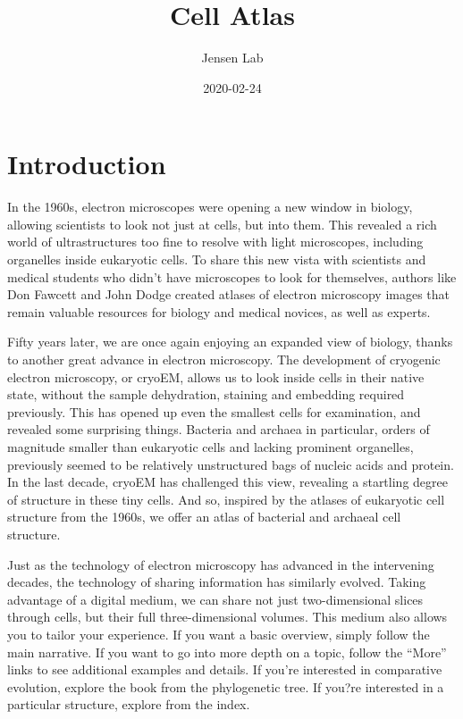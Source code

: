 \documentclass[]{tufte-book}
\title{Cell Atlas}
\author{Jensen Lab}
\date{2020-02-24}
\begin{document}
\maketitle



{
\setcounter{tocdepth}{1}
\tableofcontents
}

\chapter*{Introduction}\label{introduction}

In the 1960s, electron microscopes were opening a new window in biology,
allowing scientists to look not just at cells, but into them. This
revealed a rich world of ultrastructures too fine to resolve with light
microscopes, including organelles inside eukaryotic cells. To share this
new vista with scientists and medical students who didn't have
microscopes to look for themselves, authors like Don Fawcett and John
Dodge created atlases of electron microscopy images that remain valuable
resources for biology and medical novices, as well as experts.

Fifty years later, we are once again enjoying an expanded view of
biology, thanks to another great advance in electron microscopy. The
development of cryogenic electron microscopy, or cryoEM, allows us to
look inside cells in their native state, without the sample dehydration,
staining and embedding required previously. This has opened up even the
smallest cells for examination, and revealed some surprising things.
Bacteria and archaea in particular, orders of magnitude smaller than
eukaryotic cells and lacking prominent organelles, previously seemed to
be relatively unstructured bags of nucleic acids and protein. In the
last decade, cryoEM has challenged this view, revealing a startling
degree of structure in these tiny cells. And so, inspired by the atlases
of eukaryotic cell structure from the 1960s, we offer an atlas of
bacterial and archaeal cell structure.

Just as the technology of electron microscopy has advanced in the
intervening decades, the technology of sharing information has similarly
evolved. Taking advantage of a digital medium, we can share not just
two-dimensional slices through cells, but their full three-dimensional
volumes. This medium also allows you to tailor your experience. If you
want a basic overview, simply follow the main narrative. If you want to
go into more depth on a topic, follow the ``More'' links to see
additional examples and details. If you're interested in comparative
evolution, explore the book from the phylogenetic tree. If you?re
interested in a particular structure, explore from the index.
\end{document}
